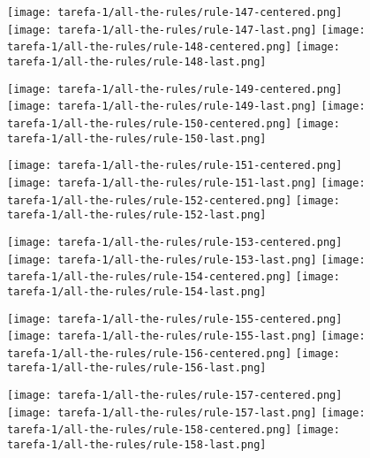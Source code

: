 \begin{figure}[htbp]
  \centering
\texttt{[image: tarefa-1/all-the-rules/rule-147-centered.png]}
\texttt{[image: tarefa-1/all-the-rules/rule-147-last.png]}
\texttt{[image: tarefa-1/all-the-rules/rule-148-centered.png]}
\texttt{[image: tarefa-1/all-the-rules/rule-148-last.png]}
\end{figure}
\begin{figure}[htbp]
  \centering
\texttt{[image: tarefa-1/all-the-rules/rule-149-centered.png]}
\texttt{[image: tarefa-1/all-the-rules/rule-149-last.png]}
\texttt{[image: tarefa-1/all-the-rules/rule-150-centered.png]}
\texttt{[image: tarefa-1/all-the-rules/rule-150-last.png]}
\end{figure}
\begin{figure}[htbp]
  \centering
\texttt{[image: tarefa-1/all-the-rules/rule-151-centered.png]}
\texttt{[image: tarefa-1/all-the-rules/rule-151-last.png]}
\texttt{[image: tarefa-1/all-the-rules/rule-152-centered.png]}
\texttt{[image: tarefa-1/all-the-rules/rule-152-last.png]}
\end{figure}
\begin{figure}[htbp]
  \centering
\texttt{[image: tarefa-1/all-the-rules/rule-153-centered.png]}
\texttt{[image: tarefa-1/all-the-rules/rule-153-last.png]}
\texttt{[image: tarefa-1/all-the-rules/rule-154-centered.png]}
\texttt{[image: tarefa-1/all-the-rules/rule-154-last.png]}
\end{figure}
\begin{figure}[htbp]
  \centering
\texttt{[image: tarefa-1/all-the-rules/rule-155-centered.png]}
\texttt{[image: tarefa-1/all-the-rules/rule-155-last.png]}
\texttt{[image: tarefa-1/all-the-rules/rule-156-centered.png]}
\texttt{[image: tarefa-1/all-the-rules/rule-156-last.png]}
\end{figure}
\begin{figure}[htbp]
  \centering
\texttt{[image: tarefa-1/all-the-rules/rule-157-centered.png]}
\texttt{[image: tarefa-1/all-the-rules/rule-157-last.png]}
\texttt{[image: tarefa-1/all-the-rules/rule-158-centered.png]}
\texttt{[image: tarefa-1/all-the-rules/rule-158-last.png]}
\end{figure}
